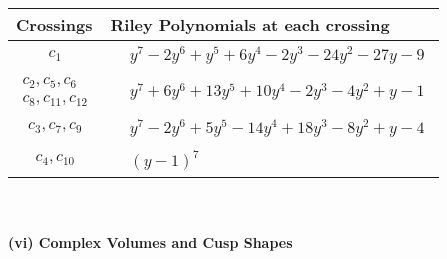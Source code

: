 \documentclass[1p]{elsarticle_modified}
\theoremstyle{definition}
\begin{document}
\begin{tabular}{m{50pt}|m{274pt}}
Crossings & \hspace{64pt}Riley Polynomials at each crossing \\
\hline $$\begin{aligned}c_{1}\end{aligned}$$&$\begin{aligned}
&y^7-2 y^6+y^5+6 y^4-2 y^3-24 y^2-27 y-9
\end{aligned}$\\
\hline $$\begin{aligned}c_{2},c_{5},c_{6}\\c_{8},c_{11},c_{12}\end{aligned}$$&$\begin{aligned}
&y^7+6 y^6+13 y^5+10 y^4-2 y^3-4 y^2+y-1
\end{aligned}$\\
\hline $$\begin{aligned}c_{3},c_{7},c_{9}\end{aligned}$$&$\begin{aligned}
&y^7-2 y^6+5 y^5-14 y^4+18 y^3-8 y^2+y-4
\end{aligned}$\\
\hline $$\begin{aligned}c_{4},c_{10}\end{aligned}$$&$\begin{aligned}
&(y-1)^7
\end{aligned}$\\
\hline
\end{tabular}\\~\\
\newpage\flushleft \textbf{(vi) Complex Volumes and Cusp Shapes}
\end{document}
